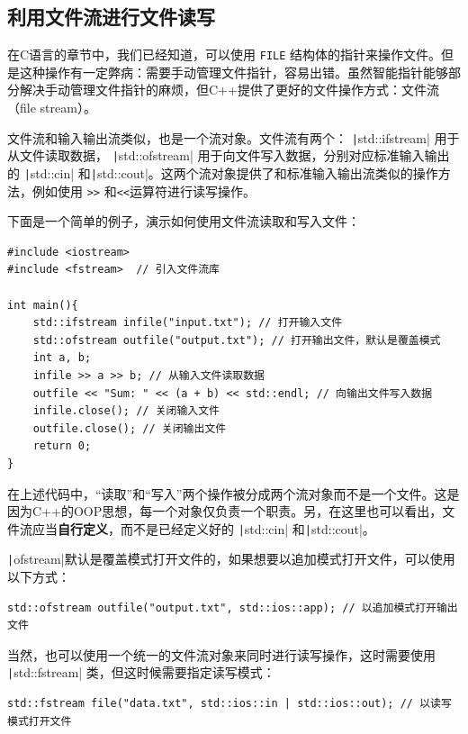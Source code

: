 \subsection{利用文件流进行文件读写}

在C语言的章节中，我们已经知道，可以使用 \verb|FILE| 结构体的指针来操作文件。但是这种操作有一定弊病：需要手动管理文件指针，容易出错。虽然智能指针能够部分解决手动管理文件指针的麻烦，但C++提供了更好的文件操作方式：文件流（file stream）。

文件流和输入输出流类似，也是一个流对象。文件流有两个： \texttt|std::ifstream| 用于从文件读取数据， \texttt|std::ofstream| 用于向文件写入数据，分别对应标准输入输出的 \texttt|std::cin| 和\texttt|std::cout|。这两个流对象提供了和标准输入输出流类似的操作方法，例如使用 \texttt{>>} 和\texttt{<<}运算符进行读写操作。

下面是一个简单的例子，演示如何使用文件流读取和写入文件：
\begin{verbatim}
#include <iostream> 
#include <fstream>  // 引入文件流库

int main(){
    std::ifstream infile("input.txt"); // 打开输入文件
    std::ofstream outfile("output.txt"); // 打开输出文件，默认是覆盖模式
    int a, b;
    infile >> a >> b; // 从输入文件读取数据
    outfile << "Sum: " << (a + b) << std::endl; // 向输出文件写入数据
    infile.close(); // 关闭输入文件
    outfile.close(); // 关闭输出文件
    return 0;
}
\end{verbatim}
在上述代码中，“读取”和“写入”两个操作被分成两个流对象而不是一个文件。这是因为C++的OOP思想，每一个对象仅负责一个职责。另，在这里也可以看出，文件流应当\textbf{自行定义}，而不是已经定义好的 \texttt|std::cin| 和\texttt|std::cout|。

\texttt|ofstream|默认是覆盖模式打开文件的，如果想要以追加模式打开文件，可以使用以下方式：
\begin{verbatim}
std::ofstream outfile("output.txt", std::ios::app); // 以追加模式打开输出文件
\end{verbatim}

当然，也可以使用一个统一的文件流对象来同时进行读写操作，这时需要使用 \texttt|std::fstream| 类，但这时候需要指定读写模式：
\begin{verbatim}
std::fstream file("data.txt", std::ios::in | std::ios::out); // 以读写模式打开文件
\end{verbatim}

